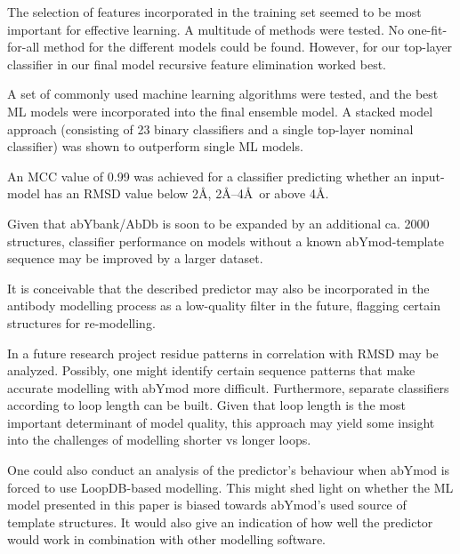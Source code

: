\documentclass[12pt]{article}
\begin{document}
The selection of features incorporated in the training set seemed to
be most important for effective learning. A multitude of methods were
tested. No one-fit-for-all method for the different models could be
found. However, for our top-layer classifier in our final model
recursive feature elimination worked best.

A set of commonly used machine learning algorithms were tested, and
the best ML models were incorporated into the final ensemble model. A
stacked model approach (consisting of 23 binary classifiers and a
single top-layer nominal classifier) was shown to outperform single ML
models.

An MCC value of 0.99 was achieved for a classifier predicting whether
an input-model has an RMSD value below 2\AA, 2\AA--4\AA\ or above
4\AA.

Given that abYbank/AbDb is soon to be expanded by an additional
ca. 2000 structures, classifier performance on models without a known
abYmod-template sequence may be improved by a larger dataset.

It is conceivable that the described predictor may also be
incorporated in the antibody modelling process as a low-quality filter
in the future, flagging certain structures for re-modelling.

In a future research project residue patterns in correlation with RMSD
may be analyzed. Possibly, one might identify certain sequence
patterns that make accurate modelling with abYmod more
difficult. Furthermore, separate classifiers according to loop length
can be built. Given that loop length is the most important determinant
of model quality, this approach may yield some insight into the
challenges of modelling shorter vs longer loops.

One could also conduct an analysis of the predictor's behaviour when
abYmod is forced to use LoopDB-based modelling. This might shed light
on whether the ML model presented in this paper is biased towards
abYmod's used source of template structures. It would also give an
indication of how well the predictor would work in combination with
other modelling software.


\end{document}
